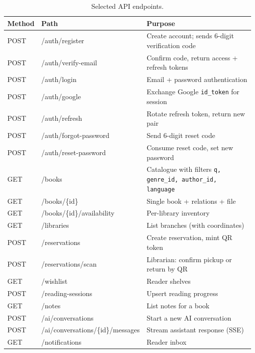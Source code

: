 \documentclass[12pt,a4paper]{report}
\begin{document}
\begin{table}[H]
\centering
\caption{Selected API endpoints.}
\label{tab:endpoints}
\small
\begin{tabularx}{\textwidth}{l l X}
\toprule
\textbf{Method} & \textbf{Path} & \textbf{Purpose} \\
\midrule
POST   & /auth/register             & Create account; sends 6-digit verification code \\
POST   & /auth/verify-email         & Confirm code, return access + refresh tokens \\
POST   & /auth/login                & Email + password authentication \\
POST   & /auth/google               & Exchange Google \texttt{id\_token} for session \\
POST   & /auth/refresh              & Rotate refresh token, return new pair \\
POST   & /auth/forgot-password      & Send 6-digit reset code \\
POST   & /auth/reset-password       & Consume reset code, set new password \\
GET    & /books                     & Catalogue with filters \texttt{q, genre\_id, author\_id, language} \\
GET    & /books/\{id\}              & Single book + relations + file \\
GET    & /books/\{id\}/availability & Per-library inventory \\
GET    & /libraries                 & List branches (with coordinates) \\
POST   & /reservations              & Create reservation, mint QR token \\
POST   & /reservations/scan         & Librarian: confirm pickup or return by QR \\
GET    & /wishlist                  & Reader shelves \\
POST   & /reading-sessions          & Upsert reading progress \\
GET    & /notes                     & List notes for a book \\
POST   & /ai/conversations          & Start a new AI conversation \\
POST   & /ai/conversations/\{id\}/messages & Stream assistant response (SSE) \\
GET    & /notifications             & Reader inbox \\
\bottomrule
\end{tabularx}
\end{table}
\end{document}
